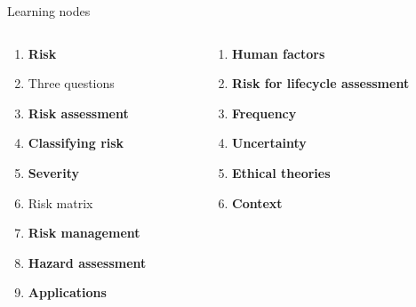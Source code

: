 \documentclass[aspectratio=1610,pdftex,dvipsnames,compress,xcolor={dvipsnames}]{beamer}
\begin{document}
\begin{frame}{Learning nodes}
    \begin{columns}[t]

        \begin{column}{0.50\textwidth}
            \begin{enumerate}[series=outerlist,topsep=0pt,itemsep=1pt,leftmargin=*,label=(\arabic*)]
                \item[]\textbf{Risk}
                \item[]Three questions
                    \vspace{0.10in}
                \item[]\textbf{Risk assessment}
                    \vspace{0.10in}
                \item[]\textbf{Classifying risk}
                    \vspace{0.10in}
                \item[]\textbf{Severity}
                \item[]Risk matrix
                    \vspace{0.10in}
                \item[]\textbf{Risk management}
                    \vspace{0.10in}
                \item[]\textbf{Hazard assessment}
                    \vspace{0.10in}
                \item[]\textbf{Applications}
            \end{enumerate}
        \end{column}

        \begin{column}{0.50\textwidth}
            \begin{enumerate}[series=outerlist,topsep=0pt,itemsep=1pt,leftmargin=*,label=(\arabic*)]
                \item[]\hfill\textbf{Human factors}
                    \vspace{0.10in}
                \item[]\hfill\textbf{Risk for lifecycle assessment}
                    \vspace{0.10in}
                \item[]\hfill\textbf{Frequency}
                    \vspace{0.10in}
                \item[]\hfill\textbf{Uncertainty}
                    \vspace{0.10in}
                \item[]\hfill\textbf{Ethical theories}
                    \vspace{0.10in}
                \item[]\hfill\textbf{Context}
            \end{enumerate}
        \end{column}

    \end{columns}
\end{frame}
\end{document}
